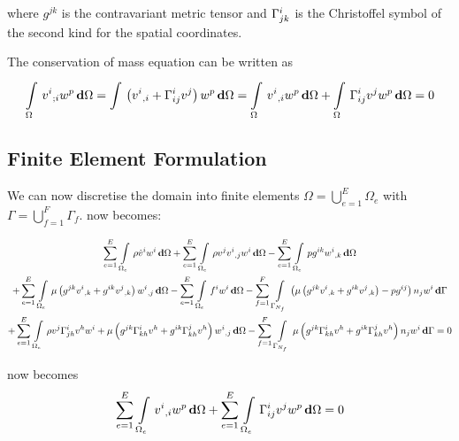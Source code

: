 where $g^{jk}$ is the contravariant metric tensor and $ \Gamma^{i}_{jk} $
is the Christoffel symbol of the second kind for the spatial coordinates.

The conservation of mass equation can be written as
\begin{equation}
  \gint{\Omega}{}{\covarderiv{v^{i}}{i}w^{p}}{\Omega}=
  \gint{}{}{\pbrac{\partialderiv{v^{i}}{i}+\christoffel{i}{i}{j}v^{j}}w^{p}}{\Omega}=
  \gint{\Omega}{}{\partialderiv{v^{i}}{i}w^{p}}{\Omega}+\gint{\Omega}{}{\christoffel{i}{i}{j}v^{j}w^{p}}{\Omega}=0
  \label{eqn:TensorConvOfMass}
\end{equation}

\subsection{Finite Element Formulation}

We can now discretise the domain into finite elements \ie
$\Omega=\displaystyle{\bigcup_{e=1}^{E}}\Omega_{e}$ with
$\Gamma=\displaystyle{\bigcup_{f=1}^{F}}\Gamma_{f}$.  now
becomes:

\begin{multline}
  \gsum{e=1}{E}{\gint{\Omega_{e}}{}{\rho\dot{v}^{i}w^{i}}{\Omega}}
 +\gsum{e=1}{E}{\gint{\Omega_{e}}{}{\rho v^{j}\partialderiv{v^{i}}{j}{w^{i}}}{\Omega}}
 -\gsum{e=1}{E}{\gint{\Omega_{e}}{}{pg^{ik}\partialderiv{w^{i}}{k}}{\Omega}}\\
 +\gsum{e=1}{E}{\gint{\Omega_{e}}{}{\mu\pbrac{g^{jk}\partialderiv{v^{i}}{k}+
       g^{ik}\partialderiv{v^{j}}{k}}\partialderiv{w^{i}}{j}}{\Omega}}
 -\gsum{e=1}{E}{\gint{\Omega_{e}}{}{f^{i}w^{i}}{\Omega}}
 -\gsum{f=1}{F}{\gint{\Gamma_{N_{f}}}{}{\pbrac{\mu\pbrac{g^{jk}\partialderiv{v^{i}}{k}+g^{ik}\partialderiv{v^{j}}{k}}-pg^{ij}}n_{j}w^{i}}{\Gamma}}\\
 +\gsum{e=1}{E}{\gint{\Omega_{e}}{}{\rho
   v^{j}\christoffel{i}{j}{h}v^{h}w^{i}+\mu\pbrac{g^{jk}\christoffel{i}{k}{h}v^{h}+
     g^{ik}\christoffel{j}{k}{h}v^{h}}\partialderiv{w^{i}}{j}}{\Omega}}
 -\gsum{f=1}{F}{\gint{\Gamma_{N_{f}}}{}{\mu\pbrac{g^{jk}\christoffel{i}{k}{h}v^{h}+g^{ik}\christoffel{j}{k}{h}v^{h}}n_{j}w^{i}}{\Gamma}}=0
 \label{eqn:FEMNSE}
\end{multline}

 now becomes
\begin{equation}
    \displaystyle\sum_{e=1}^{E} \,  \displaystyle\int\limits_{\Omega_{e}}^{} \, {v^{i}}_{,i} w^{p}\, \boldsymbol{\mathrm{d}} \Omega  
  +  \displaystyle\sum_{e=1}^{E} \,  \displaystyle\int\limits_{\Omega_{e}}^{} \, \Gamma^{i}_{ij} v^{j}w^{p}\, \boldsymbol{\mathrm{d}} \Omega  =0
\end{equation}

